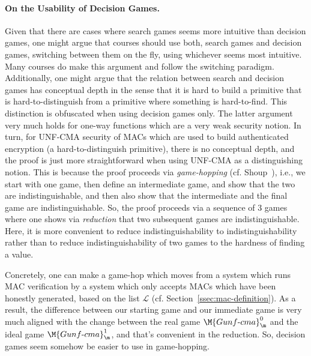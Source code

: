 \paragraph{On the Usability of Decision Games.} Given that there are cases where search games seems more intuitive than decision games, one might argue that courses should use both, search games and decision games, switching between them on the fly, using whichever seems most intuitive. Many courses do make this argument and follow the switching paradigm. Additionally, one might argue that the relation between search and decision games has conceptual depth in the sense that it is hard to build a primitive that is hard-to-distinguish from a primitive where something is hard-to-find. This distinction is obfuscated when using decision games only. The latter argument very much holds for one-way functions which are a very weak security notion. In turn, for UNF-CMA security of MACs which are used to build authenticated encryption (a hard-to-distinguish primitive), there is no conceptual depth, and the proof is just more straightforward when using UNF-CMA as a distinguishing notion. This is because the proof proceeds via
\emph{game-hopping} (cf. Shoup~\cite{Shoup04}), i.e., we start with one game, then define an intermediate game, and show that the two are indistinguishable, and then also show that the intermediate and the final game are indistinguishable. So, the proof proceeds via a sequence of 3 games where one shows via \emph{reduction} that two subsequent games are indistinguishable. Here, it is more convenient to reduce indistinguishability to indistinguishability rather than to reduce indistinguishability of two games to the hardness of finding a value.

Concretely, one can make a game-hop which moves from a system which runs MAC verification by a system which only accepts MACs which have been honestly generated, based on the list $\mathcal{L}$ (cf. Section~\ref{ssec:mac-definition}). As a result, the
difference between our starting game and our immediate game is very much aligned with the change between the real game $\M{Gunf\text{-}cma}^0_\m$ and the ideal game $\M{Gunf\text{-}cma}^1_\m$, and that's convenient in the reduction. So, decision games seem somehow be easier to use in game-hopping.

